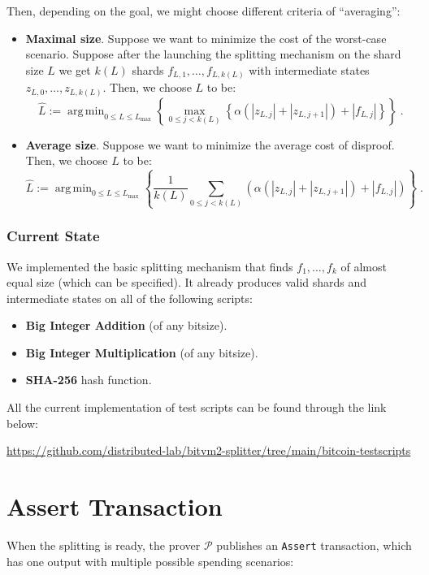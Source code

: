 \documentclass{iacrtrans}
\DeclareMathOperator*{\argmin}{arg\,min}
\begin{document}
Then, depending on the goal, we might choose different criteria of ``averaging'':
\begin{itemize}
  \item \textbf{Maximal size}. Suppose we want to minimize the cost of the worst-case scenario. Suppose after the launching the splitting mechanism on the shard size $L$ we get $k(L)$ shards $f_{L,1},\dots,f_{L,k(L)}$ with intermediate states $z_{L,0},\dots,z_{L,k(L)}$. Then, we choose $L$ to be:
  \begin{equation*}
    \hat{L} := \argmin_{0 \leq L \leq L_{\max}} \left\{ \max_{ 0 \leq j < k(L) } \left\{ \alpha(|z_{L,j}| + |z_{L,j+1}|) + |f_{L,j}| \right\} \right\}\;.
  \end{equation*}
  \item \textbf{Average size}. Suppose we want to minimize the average cost of disproof. Then, we choose $L$ to be:
  \begin{equation*}
    \hat{L} := \argmin_{0 \leq L \leq L_{\max}} \left\{ \frac{1}{k(L)} \sum_{0 \leq j < k(L)} \left( \alpha(|z_{L,j}| + |z_{L,j+1}|) + |f_{L,j}| \right) \right\}\;.
  \end{equation*}
\end{itemize}

\subsubsection{Current State}
We implemented the basic splitting mechanism that finds $f_1,\dots,f_k$ of almost equal size (which can be specified). It already produces valid shards and intermediate states on all of the following scripts:
\begin{itemize}
    \item \textbf{Big Integer Addition} (of any bitsize).
    \item \textbf{Big Integer Multiplication} (of any bitsize).
    \item \textbf{SHA-256} hash function.
\end{itemize}

All the current implementation of test scripts can be found through the link below:
\begin{center}
  \url{https://github.com/distributed-lab/bitvm2-splitter/tree/main/bitcoin-testscripts}
\end{center}


\section{Assert Transaction}\label{sec:assert-tx}
When the splitting is ready, the prover $\mathcal{P}$ publishes an \texttt{Assert} transaction,
which has one output with multiple possible spending scenarios:
\end{document}
